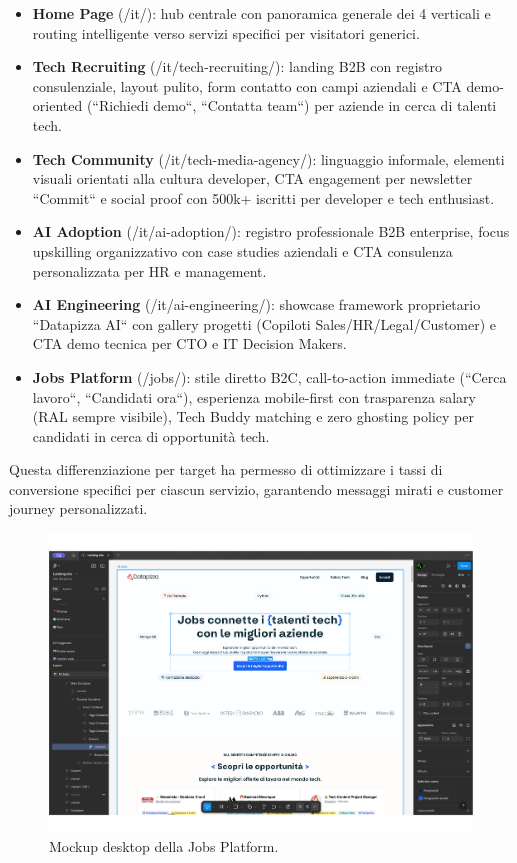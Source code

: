 \begin{itemize}
  \item \textbf{Home Page} (/it/): hub centrale con panoramica generale dei 
  4 verticali e routing intelligente verso servizi specifici per visitatori generici.
  
  \item \textbf{Tech Recruiting} (/it/tech-recruiting/): landing B2B con registro 
  consulenziale, layout pulito, form contatto con campi aziendali e CTA demo-oriented 
  (``Richiedi demo``, ``Contatta team``) per aziende in cerca di talenti tech.
  
  \item \textbf{Tech Community} (/it/tech-media-agency/): linguaggio informale, 
  elementi visuali orientati alla cultura developer, CTA engagement per newsletter 
  ``Commit`` e social proof con 500k+ iscritti per developer e tech enthusiast.
  
  \item \textbf{AI Adoption} (/it/ai-adoption/): registro professionale B2B 
  enterprise, focus upskilling organizzativo con case studies aziendali e CTA 
  consulenza personalizzata per HR e management.
  
  \item \textbf{AI Engineering} (/it/ai-engineering/): showcase framework 
  proprietario ``Datapizza AI`` con gallery progetti (Copiloti Sales/HR/Legal/Customer) 
  e CTA demo tecnica per CTO e IT Decision Makers.
  
  \item \textbf{Jobs Platform} (/jobs/): stile diretto B2C, call-to-action 
  immediate (``Cerca lavoro``, ``Candidati ora``), esperienza mobile-first con 
  trasparenza salary (RAL sempre visibile), Tech Buddy matching e zero ghosting 
  policy per candidati in cerca di opportunità tech.
\end{itemize}

Questa differenziazione per target ha permesso di ottimizzare i tassi di 
conversione specifici per ciascun servizio, garantendo messaggi mirati e 
customer journey personalizzati.

\begin{figure}[h!]
    \centering
    \includegraphics[width=1.06\textwidth]{chapters/figures/mockup.pdf}
    \caption{Mockup desktop della Jobs Platform.}
    \label{fig:jobs-desktop}
\end{figure}

